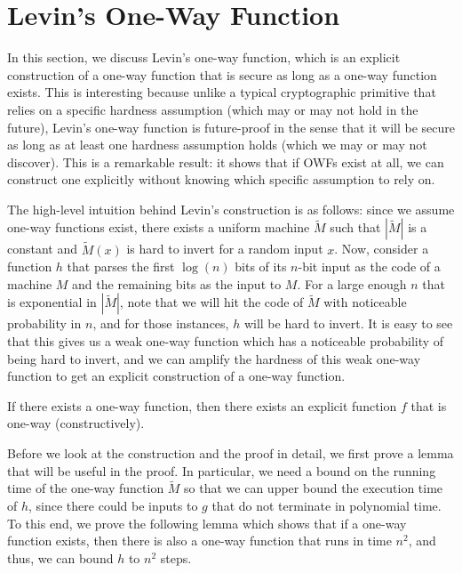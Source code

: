 \section{Levin's One-Way Function}
\label{sec:levin-owf}
In this section, we discuss Levin's one-way function, which is an explicit construction of a one-way function that is secure as long as a one-way function exists.
This is interesting because unlike a typical cryptographic primitive that relies on a specific hardness assumption (which may or may not hold in the future), Levin's one-way function is future-proof in the sense that it will be secure as long as at least one hardness assumption holds (which we may or may not discover). This is a remarkable result: it shows that if OWFs exist at all, we can construct one explicitly without knowing which specific assumption to rely on.

The high-level intuition behind Levin's construction is as follows: since we assume one-way functions exist, there exists a uniform machine $\tilde M$ such that $|\tilde M|$ is a constant and $\tilde M(x)$ is hard to invert for a random input $x$.
Now, consider a function $h$ that parses the first $\log(n)$ bits of its $n$-bit input as the code of a machine $M$ and the remaining bits as the input to $M$.
For a large enough $n$ that is exponential in $|\tilde{M}|$, note that we will hit the code of $\tilde{M}$ with noticeable probability in $n$, and for those instances, $h$ will be hard to invert.
It is easy to see that this gives us a weak one-way function which has a noticeable probability of being hard to invert, and we can amplify the hardness of this weak one-way function to get an explicit construction of a one-way function.

\begin{theorem}\label{thm:levin}
If there exists a one-way function, then there exists an explicit function $f$ that is one-way  (constructively).
\end{theorem}

Before we look at the construction and the proof in detail, we first prove a lemma that will be useful in the proof.
In particular, we need a bound on the running time of the one-way function $\tilde M$ so that we can upper bound the execution time of $h$, since there could be inputs to $g$ that do not terminate in polynomial time.
To this end, we prove the following lemma which shows that if a one-way function exists, then there is also a one-way function that runs in time $n^2$, and thus, we can bound $h$ to $n^2$ steps.


